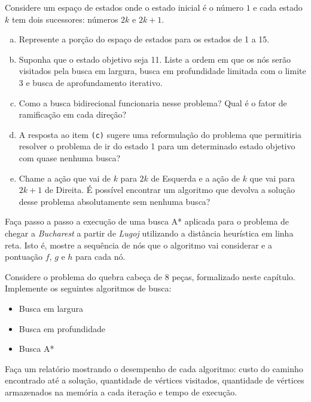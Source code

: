 \begin{exercise}
Considere um espaço de estados onde o estado inicial é o número $1$ e cada estado $k$ tem dois sucessores: números $2k$ e $2k + 1$.

\begin{enumerate}[a.]
	\item Represente a porção do espaço de estados para os estados de 1 a 15.
	
	\item Suponha que o estado objetivo seja 11. Liste a ordem em que os nós serão visitados pela busca em largura, busca em profundidade limitada com o limite 3 e busca de aprofundamento iterativo.
	
	\item Como a busca bidirecional funcionaria nesse problema? Qual é o fator de ramificação em cada direção?
	
	\item A resposta ao item \texttt{(c)} sugere uma reformulação do problema que permitiria resolver o problema de ir do estado 1 para um determinado estado objetivo com quase nenhuma busca?
	
	\item Chame a ação que vai de $k$ para $2k$ de Esquerda e a ação de $k$ que vai para $2k + 1$ de Direita. É possível encontrar um algoritmo que devolva a solução desse problema absolutamente sem nenhuma busca?
\end{enumerate}
\end{exercise}

\begin{exercise}
Faça passo a passo a execução de uma busca A* aplicada para o problema de chegar a \textit{Bucharest} a partir de \textit{Lugoj} utilizando a distância heurística em linha reta. Isto é, mostre a sequência de nós que o algoritmo vai considerar e a pontuação $f$, $g$ e $h$ para cada nó.
\end{exercise}

\begin{exercise}
Considere o problema do quebra cabeça de 8 peças, formalizado neste capítulo. Implemente os seguintes algoritmos de busca:

\begin{itemize}
	\item Busca em largura
	\item Busca em profundidade
	\item Busca A*
\end{itemize}

Faça um relatório mostrando o desempenho de cada algoritmo: custo do caminho encontrado até a solução, quantidade de vértices visitados, quantidade de vértices armazenados na memória a cada iteração e tempo de execução.
\end{exercise}

